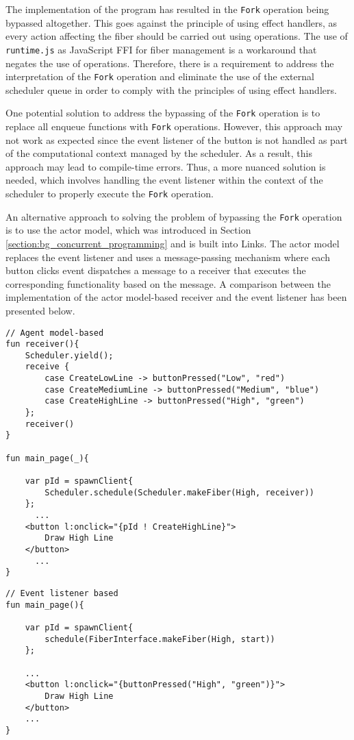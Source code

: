 \documentclass[logo,bsc,singlespacing,parskip]{infthesis}
\begin{document}
The implementation of the program has resulted in the \texttt{Fork} operation being bypassed altogether. This goes against the principle of using effect handlers, as every action affecting the fiber should be carried out using operations. The use of \texttt{runtime.js} as JavaScript FFI for fiber management is a workaround that negates the use of operations. Therefore, there is a requirement to address the interpretation of the \texttt{Fork} operation and eliminate the use of the external scheduler queue in order to comply with the principles of using effect handlers.

One potential solution to address the bypassing of the \texttt{Fork} operation is to replace all enqueue functions with \texttt{Fork} operations. However, this approach may not work as expected since the event listener of the button is not handled as part of the computational context managed by the scheduler. As a result, this approach may lead to compile-time errors. Thus, a more nuanced solution is needed, which involves handling the event listener within the context of the scheduler to properly execute the \texttt{Fork} operation.

An alternative approach to solving the problem of bypassing the \texttt{Fork} operation is to use the actor model, which was introduced in Section \ref{section:bg_concurrent_programming} and is built into Links. The actor model replaces the event listener and uses a message-passing mechanism where each button clicks event dispatches a message to a receiver that executes the corresponding functionality based on the message. A comparison between the implementation of the actor model-based receiver and the event listener has been presented below.
\begin{verbatim}
// Agent model-based
fun receiver(){
    Scheduler.yield();
    receive {
        case CreateLowLine -> buttonPressed("Low", "red")
        case CreateMediumLine -> buttonPressed("Medium", "blue")
        case CreateHighLine -> buttonPressed("High", "green")
    };
    receiver()
}

fun main_page(_){

    var pId = spawnClient{
        Scheduler.schedule(Scheduler.makeFiber(High, receiver))
    };
      ...
    <button l:onclick="{pId ! CreateHighLine}">
        Draw High Line
    </button>
      ...
}
\end{verbatim}  
\begin{verbatim}
// Event listener based
fun main_page(){

    var pId = spawnClient{
        schedule(FiberInterface.makeFiber(High, start))
    };

    ...
    <button l:onclick="{buttonPressed("High", "green")}">
        Draw High Line
    </button>
    ...        
}
\end{verbatim}
\end{document}
